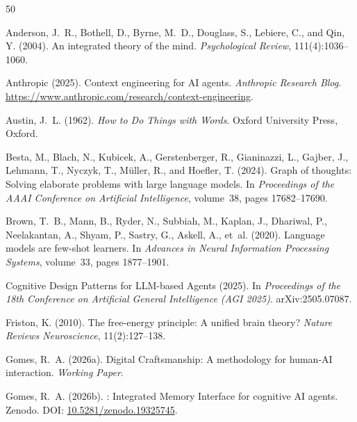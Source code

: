 \documentclass[12pt,a4paper]{article}
\begin{document}
\begin{thebibliography}{50}

Anderson, J.~R., Bothell, D., Byrne, M.~D., Douglass, S., Lebiere, C., and Qin, Y. (2004).
\newblock An integrated theory of the mind.
\newblock \emph{Psychological Review}, 111(4):1036--1060.

Anthropic (2025).
\newblock Context engineering for AI agents.
\newblock \emph{Anthropic Research Blog}.
\newblock \url{https://www.anthropic.com/research/context-engineering}.

Austin, J.~L. (1962).
\newblock \emph{How to Do Things with Words}.
\newblock Oxford University Press, Oxford.

Besta, M., Blach, N., Kubicek, A., Gerstenberger, R., Gianinazzi, L., Gajber, J., Lehmann, T., Nyczyk, T., Müller, R., and Hoefler, T. (2024).
\newblock Graph of thoughts: Solving elaborate problems with large language models.
\newblock In \emph{Proceedings of the AAAI Conference on Artificial Intelligence}, volume~38, pages 17682--17690.

Brown, T.~B., Mann, B., Ryder, N., Subbiah, M., Kaplan, J., Dhariwal, P., Neelakantan, A., Shyam, P., Sastry, G., Askell, A., et~al. (2020).
\newblock Language models are few-shot learners.
\newblock In \emph{Advances in Neural Information Processing Systems}, volume~33, pages 1877--1901.

Cognitive Design Patterns for LLM-based Agents (2025).
\newblock In \emph{Proceedings of the 18th Conference on Artificial General Intelligence (AGI 2025)}.
\newblock arXiv:2505.07087.

Friston, K. (2010).
\newblock The free-energy principle: A unified brain theory?
\newblock \emph{Nature Reviews Neuroscience}, 11(2):127--138.

Gomes, R.~A. (2026a).
\newblock Digital Craftsmanship: A methodology for human-AI interaction.
\newblock \emph{Working Paper}.

Gomes, R.~A. (2026b).
: Integrated Memory Interface for cognitive AI agents.
\newblock Zenodo. DOI: \href{https://doi.org/10.5281/zenodo.19325745}{10.5281/zenodo.19325745}.


\end{thebibliography}
\end{document}
